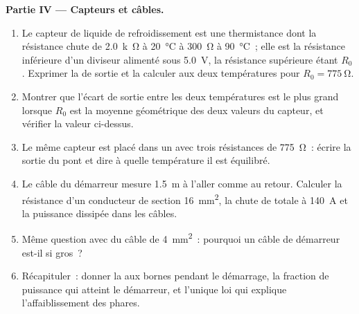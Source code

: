 \begin{problem}
\medskip
\noindent\textbf{Partie IV --- Capteurs et câbles.}
\begin{enumerate}[resume]
  \item Le capteur de liquide de refroidissement est une thermistance
        dont la résistance chute de \qty{2.0}{k\ohm} à
        \qty{20}{\degreeCelsius} à \qty{300}{\ohm} à
        \qty{90}{\degreeCelsius}~; elle est la résistance inférieure d'un
        diviseur alimenté sous \qty{5.0}{V}, la résistance supérieure
        étant $R_0$. Exprimer la  de sortie et la calculer aux
        deux températures pour $R_0 = \qty{775}{\ohm}$.
  \item Montrer que l'écart de sortie entre les deux températures est le
        plus grand lorsque $R_0$ est la moyenne géométrique des deux
        valeurs du capteur, et vérifier la valeur ci-dessus.
  \item Le même capteur est placé dans un  avec trois
        résistances de \qty{775}{\ohm}~: écrire la sortie du pont et dire
        à quelle température il est équilibré.
  \item Le câble du démarreur mesure \qty{1.5}{m} à l'aller comme au
        retour. Calculer la résistance d'un conducteur de section
        \qty{16}{mm^2}, la chute de  totale à \qty{140}{A} et la
        puissance dissipée dans les câbles.
  \item Même question avec du câble de \qty{4}{mm^2}~: pourquoi un câble
        de démarreur est-il si gros~?
  \item Récapituler~: donner la  aux bornes pendant le
        démarrage, la fraction de puissance qui atteint le démarreur, et
        l'unique loi qui explique l'affaiblissement des phares.
\end{enumerate}
\end{problem}
